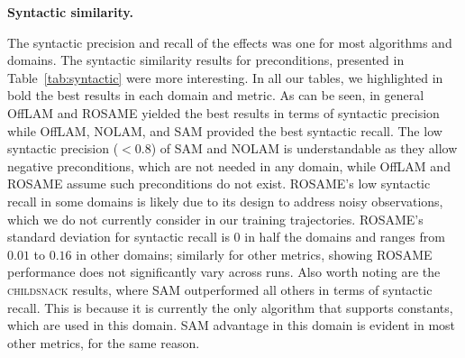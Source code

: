 \documentclass[letterpaper]{article} %
\newcommand{\pre}{\ensuremath{\textit{pre}}\xspace}
\newcommand{\eff}{\ensuremath{\textit{eff}}\xspace}
\newcommand{\nolam}{NOLAM\xspace}
\newcommand{\offlam}{OffLAM\xspace}
\newcommand{\rosame}{ROSAME\xspace}
\newcommand{\samshort}{SAM\xspace}
\newcommand{\miniparagraph}[1]{\textbf{#1.}}
\newif\ifaddcomments
\newcommand{\roni}[1]{\ifaddcomments{\textcolor{red}{[Roni: #1]}}\fi}
\newcommand{\leo}[1]{\ifaddcomments{\textcolor{pink}{[Leonardo: #1]}}\fi}
\begin{document}
\miniparagraph{Syntactic similarity} 
%

%
The syntactic precision and recall of the effects was one for most algorithms and domains. The syntactic similarity results for preconditions, presented in Table~\ref{tab:syntactic} were more interesting. In all our tables, we highlighted in bold the best results in each domain and metric. 
As can be seen, in general \offlam and \rosame yielded the best results in terms of syntactic precision 
while \offlam, \nolam, and \samshort provided the best syntactic recall. 
The low syntactic precision ($<0.8$) of \samshort and \nolam is understandable as they allow negative preconditions, which are not needed in any domain, while \offlam and \rosame assume such preconditions do not exist. 
\rosame's low syntactic recall in some domains is likely due to its design to address noisy observations, which we do not currently consider in our training trajectories. 
%
\rosame's standard deviation for syntactic recall is $0$ in half the domains and ranges from $0.01$ to $0.16$ in other domains; similarly for other metrics, showing \rosame performance does not significantly vary across runs. 
%
Also worth noting are the \textsc{childsnack} results, where \samshort outperformed all others in terms of syntactic recall. This is because it is currently the only algorithm that supports constants, which are used in this domain. \samshort advantage in this domain is evident in most other metrics, for the same reason. 
\end{document}
